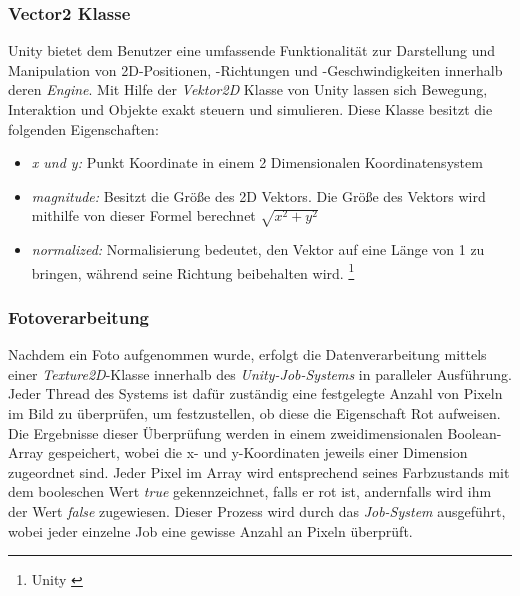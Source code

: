 \subsubsection{\label{sec:Vector2}Vector2 Klasse}
Unity bietet dem Benutzer eine umfassende Funktionalität zur Darstellung und Manipulation von 2D-Positionen, -Richtungen und -Geschwindigkeiten innerhalb deren \textit{Engine}. Mit Hilfe der \textit{Vektor2D} Klasse von Unity lassen sich Bewegung, Interaktion und Objekte exakt steuern und simulieren. Diese Klasse besitzt die folgenden Eigenschaften:
\begin{itemize}
    \item \textit{x und y: }Punkt Koordinate in einem 2 Dimensionalen Koordinatensystem
    \item \textit{magnitude: }Besitzt die Größe des 2D Vektors. Die Größe des Vektors wird mithilfe von dieser Formel berechnet $\sqrt{x^2 + y^2}$
    \item \textit{normalized: }Normalisierung bedeutet, den Vektor auf eine Länge von 1 zu bringen, während seine Richtung beibehalten wird. \protect\footnote{Unity \cite{Vector2}}
\end{itemize}

\subsubsection{Fotoverarbeitung}
Nachdem ein Foto aufgenommen wurde, erfolgt die Datenverarbeitung mittels einer \textit{Texture2D}-Klasse innerhalb des \textit{Unity-Job-Systems} in paralleler Ausführung. Jeder Thread des Systems ist dafür zuständig eine festgelegte Anzahl von Pixeln im Bild zu überprüfen, um festzustellen, ob diese die Eigenschaft Rot aufweisen. Die Ergebnisse dieser Überprüfung werden in einem zweidimensionalen Boolean-Array gespeichert, wobei die x- und y-Koordinaten jeweils einer Dimension zugeordnet sind. Jeder Pixel im Array wird entsprechend seines Farbzustands mit dem booleschen Wert \textit{true} gekennzeichnet, falls er rot ist, andernfalls wird ihm der Wert \textit{false} zugewiesen. Dieser Prozess wird durch das \textit{Job-System} ausgeführt, wobei jeder einzelne Job eine gewisse Anzahl an Pixeln überprüft.

